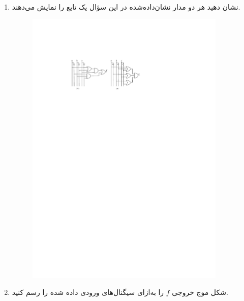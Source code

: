 \begin{enumerate}
	\item 
	نشان دهید هر دو مدار نشان‌داده‌شده در این سؤال یک تابع را نمایش می‌دهند. 
	
	\begin{figure}[h]
		\centering
		\includegraphics[width=0.9\textwidth]{fig/Q3.pdf}
		\label{fig:Q6_a}
	\end{figure}
	
	\item 
	شکل موج خروجی $f$ را به‌ازای سیگنال‌های ورودی داده شده را رسم کنید.
	

\end{enumerate}
